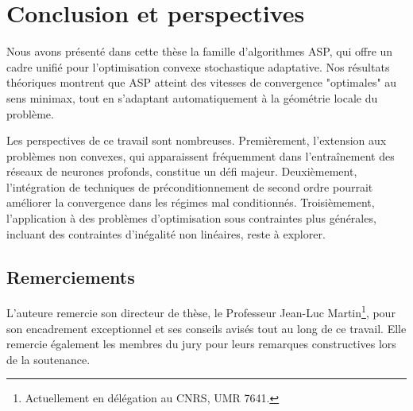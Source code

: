 \documentclass[12pt,a4paper]{report}
\begin{document}
\chapter{Conclusion et perspectives}

Nous avons pr\'esent\'e dans cette th\`ese la famille d'algorithmes ASP,
qui offre un cadre unifi\'e pour l'optimisation convexe stochastique
adaptative. Nos r\'esultats th\'eoriques montrent que ASP atteint des
vitesses de convergence "optimales" au sens minimax, tout en s'adaptant
automatiquement \`a la g\'eom\'etrie locale du probl\`eme.

Les perspectives de ce travail sont nombreuses. Premi\`erement, l'extension
aux probl\`emes non convexes, qui apparaissent fr\'equemment dans
l'entra\^inement des r\'eseaux de neurones profonds, constitue un d\'efi
majeur. Deuxi\`emement, l'int\'egration de techniques de pr\'econditionnement
de second ordre pourrait am\'eliorer la convergence dans les r\'egimes
mal conditionn\'es. Troisi\`emement, l'application \`a des probl\`emes
d'optimisation sous contraintes plus g\'en\'erales, incluant des contraintes
d'in\'egalit\'e non lin\'eaires, reste \`a explorer.

\section*{Remerciements}

L'auteure remercie son directeur de th\`ese, le Professeur Jean-Luc
Martin\footnote{Actuellement en d\'el\'egation au CNRS, UMR 7641.},
pour son encadrement exceptionnel et ses conseils avis\'es tout au long
de ce travail. Elle remercie \'egalement les membres du jury pour leurs
remarques constructives lors de la soutenance.
\end{document}

